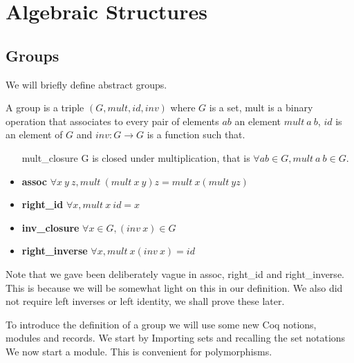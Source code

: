 \chapter{Algebraic Structures}\label{ch:algstr}

\section{Groups}

We will briefly define abstract groups. 
\begin{definition}\label{def:group}
A group is a triple $(G, mult, id, inv)$ where $G$ is a set, mult is a binary operation that associates to every pair of elements $ a b $ an element $mult\ a\ b$,  $id$ is an element of  $G$ and $inv:G\rightarrow  G$ is a function such that.
\begin{itemize}
\item[mult\_closure] 
G is closed under multiplication, that is $\forall a b \in G, mult \ a \ b \in G$.
\item {\bf assoc} $\forall x\  y\ z,  mult\ (mult\ x\ y) z = mult \  x (mult\  y z)$
 \item {\bf right\_id} $ \forall x,  mult\  x\  id = x$
 \item {\bf inv\_closure} $\forall x\in G,  (inv\ x) \in G$
   \item {\bf right\_inverse} $\forall x,  mult\ x (inv\ x) =  id$
\end{itemize}


\end{definition}

Note that we gave been deliberately vague in assoc, right\_id and right\_inverse. This is because we will be somewhat light on this in our definition. We also did not require left inverses or left identity, we shall prove these later.

To introduce the definition of a group we will use some new Coq notions, modules and  records.  
We start by Importing sets and  recalling the set notations
We now start a module. This is convenient for polymorphisms.

